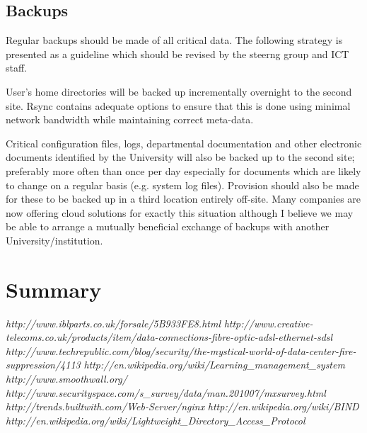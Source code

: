 \documentclass[a4paper, twoside]{article}
\begin{document}
\subsection{Backups}
Regular backups should be made of all critical data. The following strategy is
presented as a guideline which should be revised by the steerng group and ICT
staff.

User's home directories will be backed up incrementally overnight to the second
site. Rsync contains adequate options to ensure that this is done using minimal
network bandwidth while maintaining correct meta-data.

Critical configuration files, logs, departmental documentation and other
electronic documents identified by the University will also be backed up to the
second site; preferably more often than once per day especially for documents
which are likely to change on a regular basis (e.g. system log files). Provision
should also be made for these to be backed up in a third location entirely
off-site. Many companies are now offering cloud solutions for exactly this
situation although I believe we may be able to arrange a mutually beneficial
exchange of backups with another University/institution.

\section{Summary}

\begin{thebibliography}{1}

 {\em http://www.iblparts.co.uk/forsale/5B933FE8.html}
 {\em
  http://www.creative-telecoms.co.uk/products/item/data-connections-fibre-optic-adsl-ethernet-sdsl}
 {\em
  http://www.techrepublic.com/blog/security/the-mystical-world-of-data-center-fire-suppression/4113}
 {\em http://en.wikipedia.org/wiki/Learning\_management\_system}
 {\em http://www.smoothwall.org/}
 {\em http://www.securityspace.com/s\_survey/data/man.201007/mxsurvey.html}
 {\em http://trends.builtwith.com/Web-Server/nginx}
 {\em http://en.wikipedia.org/wiki/BIND}
 {\em http://en.wikipedia.org/wiki/Lightweight\_Directory\_Access\_Protocol}

\end{thebibliography}
\end{document}
